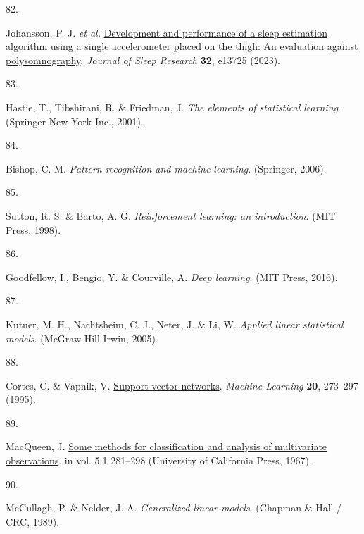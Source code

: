 \documentclass[
  10pt,
]{scrbook}
\newlength{\cslhangindent}
\newlength{\csllabelwidth}
\newlength{\cslentryspacingunit} %
\newenvironment{CSLReferences}[2] %
 {%
  \setlength{\parindent}{0pt}
  \ifodd #1
  \let\oldpar\par
  \def\par{\hangindent=\cslhangindent\oldpar}
  \fi
  \setlength{\parskip}{#2\cslentryspacingunit}
 }%
 {}
\newcommand{\CSLLeftMargin}[1]{\parbox[t]{\csllabelwidth}{#1}}
\newcommand{\CSLRightInline}[1]{\parbox[t]{\linewidth - \csllabelwidth}{#1}\break}
\let\originaltextbf\textbf
\renewcommand{\textbf}[1]{\textcolor{color1}{\textsf{\originaltextbf{#1}}}}
\begin{document}
\begin{CSLReferences}{0}{0}
\leavevmode{}%
\CSLLeftMargin{82. }%
\CSLRightInline{Johansson, P. J. \emph{et al.}
\href{https://doi.org/10.1111/jsr.13725}{Development and performance of
a sleep estimation algorithm using a single accelerometer placed on the
thigh: An evaluation against polysomnography}. \emph{Journal of Sleep
Research} \textbf{32}, e13725 (2023).}

\leavevmode{}%
\CSLLeftMargin{83. }%
\CSLRightInline{Hastie, T., Tibshirani, R. \& Friedman, J. \emph{The
elements of statistical learning}. (Springer New York Inc., 2001).}

\leavevmode{}%
\CSLLeftMargin{84. }%
\CSLRightInline{Bishop, C. M. \emph{Pattern recognition and machine
learning}. (Springer, 2006).}

\leavevmode{}%
\CSLLeftMargin{85. }%
\CSLRightInline{Sutton, R. S. \& Barto, A. G. \emph{Reinforcement
learning: an introduction}. (MIT Press, 1998).}

\leavevmode{}%
\CSLLeftMargin{86. }%
\CSLRightInline{Goodfellow, I., Bengio, Y. \& Courville, A. \emph{Deep
learning}. (MIT Press, 2016).}

\leavevmode{}%
\CSLLeftMargin{87. }%
\CSLRightInline{Kutner, M. H., Nachtsheim, C. J., Neter, J. \& Li, W.
\emph{Applied linear statistical models}. (McGraw-Hill Irwin, 2005).}

\leavevmode{}%
\CSLLeftMargin{88. }%
\CSLRightInline{Cortes, C. \& Vapnik, V.
\href{https://doi.org/10.1007/BF00994018}{Support-vector networks}.
\emph{Machine Learning} \textbf{20}, 273--297 (1995).}

\leavevmode{}%
\CSLLeftMargin{89. }%
\CSLRightInline{MacQueen, J.
\href{https://projecteuclid.org/ebooks/berkeley-symposium-on-mathematical-statistics-and-probability/Proceedings-of-the-Fifth-Berkeley-Symposium-on-Mathematical-Statistics-and/chapter/Some-methods-for-classification-and-analysis-of-multivariate-observations/bsmsp/1200512992}{Some
methods for classification and analysis of multivariate observations}.
in vol. 5.1 281--298 (University of California Press, 1967).}

\leavevmode{}%
\CSLLeftMargin{90. }%
\CSLRightInline{McCullagh, P. \& Nelder, J. A. \emph{Generalized linear
models}. (Chapman \& Hall / CRC, 1989).}


\end{CSLReferences}
\end{document}
